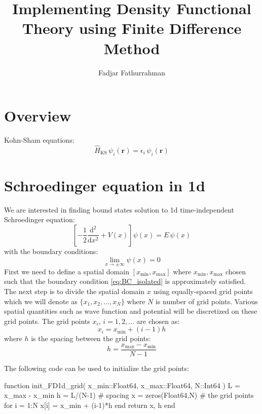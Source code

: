 \documentclass[a4paper]{article}
\begin{document}
\title{Implementing Density Functional Theory using Finite Difference Method}
\author{Fadjar Fathurrahman}
\date{}
\maketitle


\section{Overview}

Kohn-Sham equations:
\begin{equation}
\hat{H}_{\mathrm{KS}}\,\psi_{i}(\mathbf{r}) = \epsilon_{i}\,\psi_{i}(\mathbf{r})
\end{equation}


\section{Schroedinger equation in 1d}

We are interested in finding bound states solution to 1d time-independent Schroedinger equation:
\begin{equation}
\left[ -\frac{1}{2}\frac{\mathrm{d}^2}{\mathrm{d}x^2} + V(x) \right] \psi(x) = E\, \psi(x)
\label{eq:Sch_1d_eq}
\end{equation}
%
with the boundary conditions:
%
\begin{equation}
\lim_{x \rightarrow \pm \infty} \psi(x) = 0
\label{eq:BC_isolated}
\end{equation}
%
First we need to define a spatial domain $\left[x_{\mathrm{min}}, x_{\mathrm{max}}\right]$
where $x_{\mathrm{min}}, x_{\mathrm{max}}$ chosen
such that the boundary condition \ref{eq:BC_isolated} is approximately satisfied.
The next step is to divide the spatial domain $x$ using equally-spaced grid points
which we will denote as $\{x_{1},x_{2},\ldots,x_{N}\}$ where $N$ is number
of grid points. Various spatial quantities such as wave function and potential will be discretized
on these grid points.
The grid points $x_{i}$, $i = 1, 2, \ldots$ are chosen as:
\begin{equation}
x_{i} = x_{\mathrm{min}} + (i-1)h
\end{equation}
where $h$ is the spacing between the grid points:
\begin{equation}
h = \frac{ x_{\mathrm{max}} - x_{\mathrm{min}} }{N-1}
\end{equation}

The following code can be used to initialize the grid points:
\begin{juliacode}
function init_FD1d_grid( x_min::Float64, x_max::Float64, N::Int64 )
    L = x_max - x_min
    h = L/(N-1) # spacing
    x = zeros(Float64,N) # the grid points
    for i = 1:N
        x[i] = x_min + (i-1)*h
    end
    return x, h
end
\end{juliacode}
\end{document}
